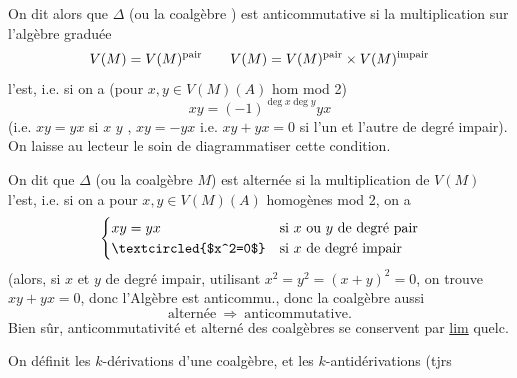 On dit alors que $\Delta$ (ou la coalgèbre ) est anticommutative si  la multiplication sur  l'algèbre graduée
\[
{V(M)=V(M)^{\mathrm{pair}}}\qquad
V(M)=V(M)^{\mathrm{pair}}\times V(M)^{\mathrm{impair}}
\]
l'est, i.e. si on a (pour $x,y\in V(M)(A)$ hom mod 2)
\[
xy=(-1)^{\deg x\deg y}yx
\]
(i.e. $xy=yx$ si $x$  $y$ ,  $xy=-yx$ i.e. $xy+yx=0$ si l'un et l'autre de degré impair). On laisse au lecteur le soin de diagrammatiser cette condition.

On dit que $\Delta$ (ou la coalgèbre $M$) est alternée si la multiplication de $V(M)$ l'est, i.e. si on a pour  $x,y\in V(M)(A)$ homogènes mod 2, on a
\[
\begin{cases}
xy=yx&\text{si }x\text{ ou }y\text{ de degré pair}\\
\textcircled{$x^2=0$}&\text{si }x\text{ de degré impair}
\end{cases}
\]
(alors, si $x$ et $y$ de degré impair, utilisant $x^2=y^2=(x+y)^2=0$, on trouve $xy+yx=0$, donc l'Algèbre est anticommu., donc  la coalgèbre aussi
\[
\text{alternée}\ \Longrightarrow\ \text{anticommutative}.
\]
Bien sûr, anticommutativité et  alterné  des  coalgèbres se conservent par \uline{lim} quelc.

On définit les $k$-dérivations d'une coalgèbre, et les $k$-antidérivations (tjrs
